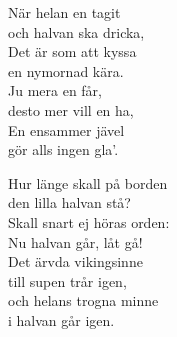 \documentclass[a6paper, 10pt, twoside]{article}
\begin{document}
\noindent
\begin{center}
\end{center}
\begin{lyrics}
När helan en tagit \\
och halvan ska dricka, \\
Det är som att kyssa \\
en nymornad kära. 
\vspace{5pt} \\
Ju mera en får, \\
desto mer vill en ha, \\
En ensammer jävel \\
gör alls ingen gla'. 
\end{lyrics}
\vspace{60pt}
\begin{center}
\end{center}
\begin{lyrics}
Hur länge skall på borden\\ 
den lilla halvan stå? \\
Skall snart ej höras orden: \\
Nu halvan går, låt gå!
\vspace{5pt} \\
Det ärvda vikingsinne \\
till supen trår igen, \\
och helans trogna minne \\
i halvan går igen.
\end{lyrics}
\end{document}
